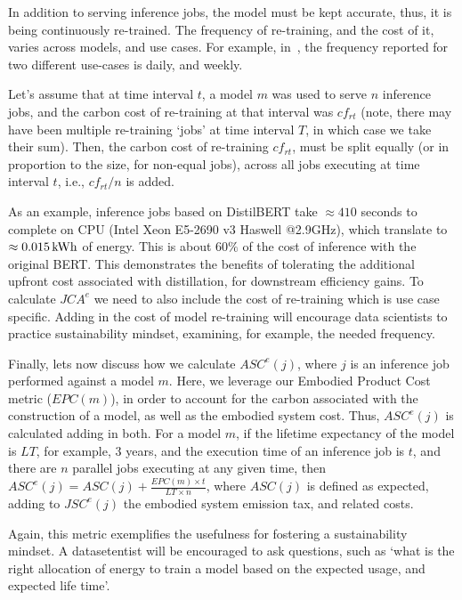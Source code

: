 {{        In addition  to serving inference jobs, the model must be kept accurate, thus, it is being continuously re-trained. The frequency of re-training, and the cost of it, varies across models, and use cases. For example, in~\cite{Wu2022}, the frequency reported for two different use-cases is daily, and weekly. 

        Let's assume that at time interval $t$, a model $m$ was used to serve $n$ inference jobs, and the carbon cost of re-training at that interval was $cf_{rt}$ (note, there may have been multiple re-training `jobs' at time interval $T$, in which case we take their sum). Then, the carbon cost of re-training $cf_{rt}$, must be split equally (or in proportion to the size, for non-equal jobs), across all jobs executing at time interval $t$, i.e., $cf_{rt} / n$ is added.

        As an example, inference jobs based on DistilBERT take $\approx 410$ seconds to complete on CPU (Intel Xeon E5-2690 v3 Haswell @2.9GHz), which translate to $\approx \unit[0.015]{kWh}$ of energy. This is about $60\%$ of the cost of inference with the original BERT. This demonstrates the benefits of tolerating the additional upfront cost associated with  distillation, for downstream efficiency gains. To calculate $JCA^{e}$ we need to also include the cost of re-training which is use case specific. Adding in the cost of model re-training will encourage data scientists to practice sustainability mindset, examining, for example, the needed frequency.

        Finally, lets now discuss how we calculate $ASC^{e} \! \left ( j \right )$, where $j$ is an inference job performed against a model $m$. Here, we leverage our Embodied Product Cost metric ($EPC \! \left ( m \right )$), in order to account for the carbon associated with  the construction of a model, as well as the embodied system cost. Thus, $ASC^{e} \! \left ( j \right )$ is calculated adding in both. For a model $m$, if the lifetime expectancy of the model is $LT$, for example, $3$ years, and the execution time of an inference job is $t$, and there are $n$ parallel jobs executing at any given time, then $ASC^{e} \! \left ( j \right ) = ASC \! \left ( j \right ) + \frac{EPC \! \left ( m \right ) \times t}{LT \times n}$, where $ASC \! \left ( j \right )$ is defined as expected, adding to $JSC^{e} \! \left ( j \right )$ the embodied system emission tax, and related costs. 

        Again, this metric exemplifies the usefulness for fostering a sustainability mindset. A datasetentist will be encouraged to ask questions, such as `what is the right allocation of energy to train a model based on the expected usage, and expected life time'. 
    }
}
